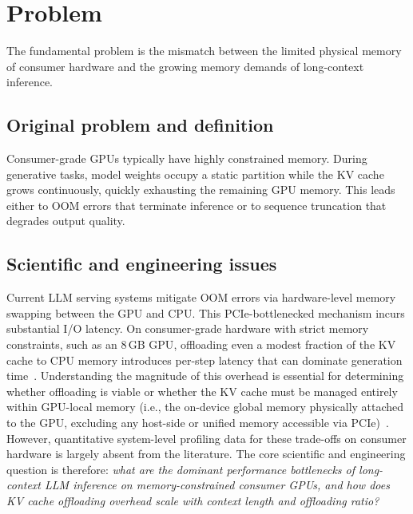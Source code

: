 \documentclass[
english,                 %
bibtex,                  %
]{kththesis}
\numberwithin{listing}{chapter}
\begin{document}
\section{Problem}
\label{sec:problem}
The fundamental problem is the mismatch between the limited physical memory of consumer hardware and the growing memory demands of long-context inference.

\subsection{Original problem and definition}
\label{sec:researchQuestion}

Consumer-grade \glspl{GPU} typically have highly constrained memory. During generative tasks, model weights occupy a static partition while the \gls{KV} cache grows continuously, quickly exhausting the remaining \gls{GPU} memory. This leads either to \gls{OOM} errors that terminate inference or to sequence truncation that degrades output quality.

\subsection{Scientific and engineering issues}
Current \gls{LLM} serving systems mitigate \gls{OOM} errors via hardware-level memory swapping between the \gls{GPU} and \gls{CPU}. This \gls{PCIe}-bottlenecked mechanism incurs substantial I/O latency. On consumer-grade hardware with strict memory constraints, such as an 8\,GB \gls{GPU}, offloading even a modest fraction of the \gls{KV} cache to \gls{CPU} memory introduces per-step latency that can dominate generation time~\cite{sheng2023flexgen, lee2024infinigen}. Understanding the magnitude of this overhead is essential for determining whether offloading is viable or whether the \gls{KV} cache must be managed entirely within \gls{GPU}-local memory (i.e., the on-device global memory physically attached to the \gls{GPU}, excluding any host-side or unified memory accessible via PCIe)~\cite{pope2023efficiently}. However, quantitative system-level profiling data for these trade-offs on consumer hardware is largely absent from the literature. The core scientific and engineering question is therefore: \textit{what are the dominant performance bottlenecks of long-context \gls{LLM} inference on memory-constrained consumer \glspl{GPU}, and how does \gls{KV} cache offloading overhead scale with context length and offloading ratio?}
\end{document}
